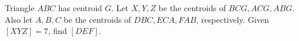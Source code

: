 Triangle $ABC$ has centroid $G$. Let $X,Y,Z$ be the centroids of $BCG,ACG,ABG$. Also let $A,B,C$ be the centroids of $DBC,ECA,FAB$, respectively. Given $[XYZ]=7$, find $[DEF]$.
